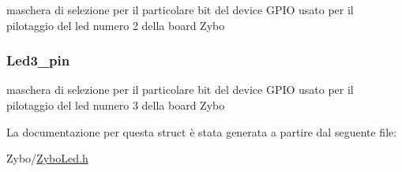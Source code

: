 maschera di selezione per il particolare bit del device G\+P\+I\+O usato per il pilotaggio del led numero 2 della board Zybo \hypertarget{struct_zybo_led__t_a85b108a2f134972366da967a9489068f}{
\subsubsection[{Led3\+\_\+pin}]{ Led3\+\_\+pin}}\label{struct_zybo_led__t_a85b108a2f134972366da967a9489068f}
maschera di selezione per il particolare bit del device G\+P\+I\+O usato per il pilotaggio del led numero 3 della board Zybo 

La documentazione per questa struct è stata generata a partire dal seguente file\+:\begin{DoxyCompactItemize}
\item 
Zybo/\hyperlink{_zybo_led_8h}{Zybo\+Led.\+h}\end{DoxyCompactItemize}
